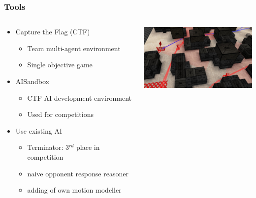 \documentclass{beamer}
\begin{document}
\begin{frame}
    \frametitle{Tools}
    \begin{minipage}[0.5\textheight]{\textwidth}
        \begin{columns}[T]
            \begin{column}{0.6\textwidth}
                \begin{itemize}
                    \item{Capture the Flag (CTF)}
                        \begin{itemize}
                            \item Team multi-agent environment
                            \item Single objective game
                        \end{itemize}
                    \item{AISandbox}
                        \begin{itemize}
                            \item CTF AI development environment
                            \item Used for competitions
                        \end{itemize}
                    \item{Use existing AI}
                        \begin{itemize}
                            \item Terminator: 3$^{rd}$ place in competition
                            \item naive opponent response reasoner
                            \item adding of own motion modeller
                        \end{itemize}
                \end{itemize}
            \end{column}
            \begin{column}{0.5\textwidth}
                \includegraphics[width=6cm]{CTF_Sandbox.jpg}
            \end{column}
        \end{columns}
    \end{minipage}
\end{frame}
\end{document}
